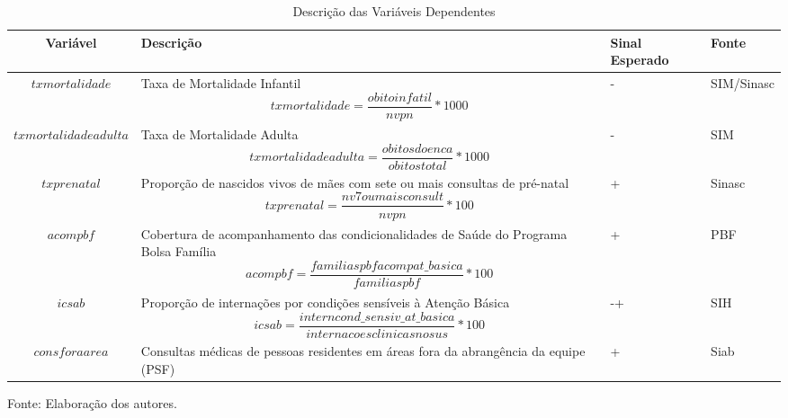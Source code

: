 \documentclass[twoside,onecolumn,12pt]{article}
\numberwithin{outputctr}{section}
\begin{document}
\begin{table}[!htb]
\caption{Descri\c{c}\~{a}o das Vari\'{a}veis Dependentes \label{tabDVarDependente}}
{\footnotesize
\begin{tabular}{cp{7cm}p{3cm}p{2cm}}
\toprule\toprule
\textbf{Vari\'{a}vel} & \textbf{Descri\c{c}\~{a}o} & \textbf{Sinal Esperado} & \textbf{Fonte}\\
\midrule
\midrule
$txmortalidade$ & Taxa de Mortalidade Infantil \begin{equation*} txmortalidade=\frac{obitoinfatil}{nvpn}*1000 \label{Eqtxmortalidade}\end{equation*}  & - & SIM/Sinasc \\
\midrule
$txmortalidadeadulta$ & Taxa de Mortalidade Adulta \begin{equation*} txmortalidadeadulta=\frac{obitosdoenca}{obitostotal}*1000 \label{Eqtxmortalidadeadulta}\end{equation*}& - & SIM\\
\midrule
$txprenatal$ & Propor\c{c}\~{a}o de nascidos vivos de m\~{a}es com sete ou mais consultas de pr\'{e}-natal \begin{equation*} txprenatal=\frac{nv7oumaisconsult}{nvpn}*100 \label{Eqtxprenatal}\end{equation*} & + & Sinasc \\[8mm]
\midrule
$acompbf$ & Cobertura de acompanhamento das condicionalidades de Sa\'{u}de do Programa Bolsa Fam\'{i}lia \begin{equation*} acompbf=\frac{familiaspbfacompat\_basica}{familiaspbf}*100 \label{Eqacompbf}\end{equation*}& + & PBF\\
\midrule
$icsab$ & Propor\c{c}\~{a}o de interna\c{c}\~{o}es por condi\c{c}\~{o}es sens\'{i}veis \`{a} Aten\c{c}\~{a}o B\'{a}sica \begin{equation*} icsab=\frac{interncond\_sensiv\_at\_basica}{internacoesclinicasnosus}*100 \label{Eq_icsab}\end{equation*}& -+ & SIH\\
\midrule
$consforaarea$ & Consultas m\'{e}dicas de pessoas residentes em \'{a}reas fora da abrang\^{e}ncia da equipe (PSF) & + & Siab\\
\bottomrule
\end{tabular}
\begin{tablenotes}
\item \tiny{Fonte: Elaboração dos autores.}
\end{tablenotes}
}
\end{table}
\end{document}

